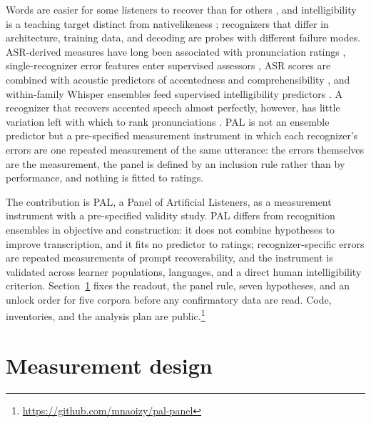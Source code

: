 Words are easier for some listeners to recover than for others
\cite{bent2003}, and intelligibility is a teaching target distinct from
nativelikeness \cite{munro1995,levis2005}; recognizers that differ in
architecture, training data, and decoding are probes with different
failure modes. ASR-derived measures have long been associated with
pronunciation ratings
\cite{neumeyer2000,cucchiarini2000}, single-recognizer error features enter supervised assessors
\cite{do2024mixup}, ASR scores are combined with acoustic predictors of
accentedness and comprehensibility \cite{dong2026accent}, and
within-family Whisper ensembles feed supervised intelligibility predictors
\cite{jin2025chorus,jin2026stereo}. A recognizer that recovers accented speech
almost perfectly, however, has little variation left with which to rank
pronunciations \cite{won2025}. PAL is not an ensemble predictor but a pre-specified measurement
instrument in which each recognizer's errors are one repeated measurement
of the same utterance: the errors themselves are the measurement, the
panel is defined by an inclusion rule rather than by performance, and
nothing is fitted to ratings.

The contribution is PAL, a Panel of Artificial Listeners, as a measurement
instrument with a pre-specified validity study. PAL differs from recognition ensembles in objective and construction: it
does not combine hypotheses to improve transcription, and it fits no
predictor to ratings; recognizer-specific errors are repeated measurements
of prompt recoverability, and the instrument is validated across learner
populations, languages, and a direct human intelligibility criterion. Section~\ref{sec:method}
fixes the readout, the panel rule, seven hypotheses, and an unlock order for
five corpora before any confirmatory data are read.  Code, inventories, and the analysis plan are
public.\footnote{\small \url{https://github.com/mnaoizy/pal-panel}}

\section{Measurement design}
\label{sec:method}
